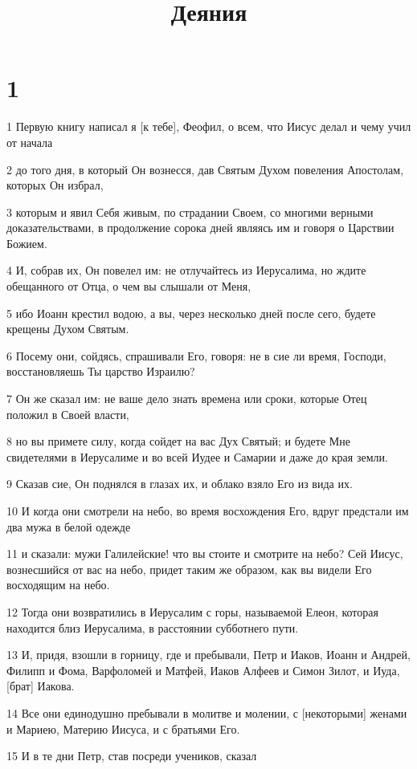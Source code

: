 

\title{Деяния}


\chapter{1}

\par 1 Первую книгу написал я [к тебе], Феофил, о всем, что Иисус делал и чему учил от начала
\par 2 до того дня, в который Он вознесся, дав Святым Духом повеления Апостолам, которых Он избрал,
\par 3 которым и явил Себя живым, по страдании Своем, со многими верными доказательствами, в продолжение сорока дней являясь им и говоря о Царствии Божием.
\par 4 И, собрав их, Он повелел им: не отлучайтесь из Иерусалима, но ждите обещанного от Отца, о чем вы слышали от Меня,
\par 5 ибо Иоанн крестил водою, а вы, через несколько дней после сего, будете крещены Духом Святым.
\par 6 Посему они, сойдясь, спрашивали Его, говоря: не в сие ли время, Господи, восстановляешь Ты царство Израилю?
\par 7 Он же сказал им: не ваше дело знать времена или сроки, которые Отец положил в Своей власти,
\par 8 но вы примете силу, когда сойдет на вас Дух Святый; и будете Мне свидетелями в Иерусалиме и во всей Иудее и Самарии и даже до края земли.
\par 9 Сказав сие, Он поднялся в глазах их, и облако взяло Его из вида их.
\par 10 И когда они смотрели на небо, во время восхождения Его, вдруг предстали им два мужа в белой одежде
\par 11 и сказали: мужи Галилейские! что вы стоите и смотрите на небо? Сей Иисус, вознесшийся от вас на небо, придет таким же образом, как вы видели Его восходящим на небо.
\par 12 Тогда они возвратились в Иерусалим с горы, называемой Елеон, которая находится близ Иерусалима, в расстоянии субботнего пути.
\par 13 И, придя, взошли в горницу, где и пребывали, Петр и Иаков, Иоанн и Андрей, Филипп и Фома, Варфоломей и Матфей, Иаков Алфеев и Симон Зилот, и Иуда, [брат] Иакова.
\par 14 Все они единодушно пребывали в молитве и молении, с [некоторыми] женами и Мариею, Материю Иисуса, и с братьями Его.
\par 15 И в те дни Петр, став посреди учеников, сказал
